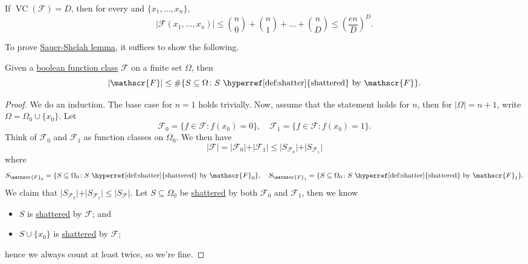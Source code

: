 \begin{lemma}\label{lma:Sauer-Shelah}
	If \(\mathop{\mathrm{VC}}(\mathscr{F}) = D\), then for every and \(\{ x_1, \dots , x_n \} \),
	\[
		\vert \mathscr{F} (x_1, \dots , x_n) \vert
		\leq \binom{n}{0} + \binom{n}{1} + \dots + \binom{n}{D}
		\leq \left( \frac{en}{D} \right) ^D.
	\]
\end{lemma}

To prove \hyperref[lma:Sauer-Shelah]{Sauer-Shelah lemma}, it suffices to show the following.

\begin{lemma}\label{lma:Pajor}
	Given a \hyperref[def:boolean-function-class]{boolean function class} \(\mathscr{F} \) on a finite set \(\Omega \), then
	\[
		\vert \mathscr{F} \vert \leq \#\{ S \subseteq \Omega \colon S \text{ \hyperref[def:shatter]{shattered} by } \mathscr{F} \}.
	\]
\end{lemma}
\begin{proof}
	We do an induction. The base case for \(n = 1\) holds trivially. Now, assume that the statement holds for \(n\), then for \(\vert \Omega \vert = n+1\), write \(\Omega = \Omega _0 \cup \{ x_0 \} \). Let
	\[
		\mathscr{F} _0 = \{ f\in \mathscr{F} \colon f(x_0) = 0\} ,\quad
		\mathscr{F} _1 = \{ f\in \mathscr{F} \colon f(x_0) = 1\} .
	\]
	Think of \(\mathscr{F} _0\) and \(\mathscr{F} _1\) as function classes on \(\Omega _0\). We then have
	\[
		\vert \mathscr{F} \vert
		= \vert \mathscr{F} _0 \vert + \vert \mathscr{F} _1 \vert
		\leq \vert S_{\mathscr{F} _0} \vert + \vert S_{\mathscr{F} _1} \vert
	\]
	where
	\[
		S_{\mathscr{F} _0} = \{ S \subseteq \Omega _0 \colon S \text{ \hyperref[def:shatter]{shattered} by } \mathscr{F} _0 \} ,\quad
		S_{\mathscr{F} _1} = \{ S \subseteq \Omega _0 \colon S \text{ \hyperref[def:shatter]{shattered} by } \mathscr{F} _1 \}.
	\]
	We claim that \(\vert S_{\mathscr{F} _0} \vert + \vert S_{\mathscr{F} _1} \vert \leq \vert S _{\mathscr{F} } \vert\). Let \(S \subseteq \Omega _0\) be \hyperref[def:shatter]{shattered} by both \(\mathscr{F} _0\) and \(\mathscr{F} _1\), then we know
	\begin{itemize}
		\item \(S\) is \hyperref[def:shatter]{shattered} by \(\mathscr{F} \); and
		\item \(S \cup \{ x_0 \} \) is \hyperref[def:shatter]{shattered} by \(\mathscr{F} \);
	\end{itemize}
	hence we always count at least twice, so we're fine.
\end{proof}


